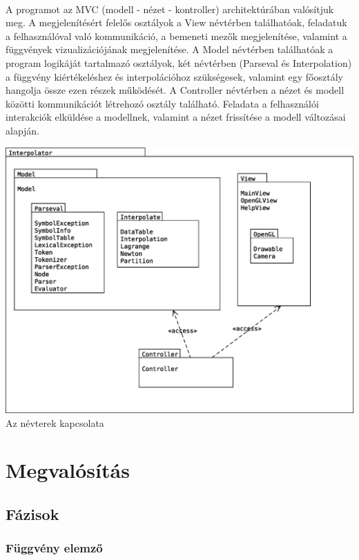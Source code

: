 \documentclass[12pt]{report}
\begin{document}
\paragraph{}
A programot az MVC (modell - nézet - kontroller) architektúrában valósítjuk meg. A megjelenítésért felelős osztályok a View névtérben találhatóak, feladatuk a felhasználóval való kommunikáció, a bemeneti mezők megjelenítése, valamint a függvények vizualizációjának megjelenítése. A Model névtérben találhatóak a program logikáját tartalmazó osztályok, két névtérben (Parseval és Interpolation) a függvény kiértékeléshez és interpolációhoz szükségesek, valamint egy főosztály hangolja össze ezen részek működését. A Controller névtérben a nézet és modell közötti kommunikációt létrehozó osztály található. Feladata a felhasználói interakciók elküldése a modellnek, valamint a nézet frissítése a modell változásai alapján.
\begin{center}
\includegraphics[width=14cm]{pics/uml/package}\\
{\footnotesize Az névterek kapcsolata}
\end{center}
\newpage

\section{Megvalósítás}
\subsection{Fázisok}
\subsubsection{Függvény elemző}
\end{document}
